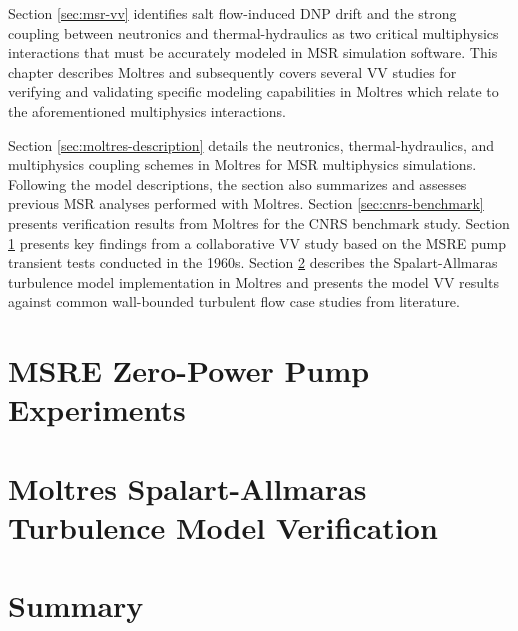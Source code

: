 Section \ref{sec:msr-vv} identifies salt flow-induced \gls{DNP} drift and the strong coupling
between neutronics and thermal-hydraulics as two critical multiphysics interactions that must be
accurately modeled in \gls{MSR} simulation software. This chapter describes Moltres and
subsequently covers several \gls{VV} studies for verifying and validating specific modeling
capabilities in Moltres which relate to the aforementioned multiphysics interactions.

Section \ref{sec:moltres-description} details the neutronics, thermal-hydraulics, and multiphysics
coupling schemes in Moltres for \gls{MSR} multiphysics simulations. Following the model
descriptions, the section also summarizes and assesses previous \gls{MSR} analyses
performed with Moltres. Section \ref{sec:cnrs-benchmark} presents verification results from Moltres
for the CNRS benchmark study. Section \ref{sec:msre-pump} presents key findings from a
collaborative \gls{VV} study based on the \gls{MSRE} pump transient tests conducted in the 1960s.
Section \ref{sec:turbulence} describes the Spalart-Allmaras turbulence model implementation in
Moltres and presents the model \gls{VV} results against common wall-bounded turbulent flow case
studies from literature.




\section{MSRE Zero-Power Pump Experiments} \label{sec:msre-pump}



\section{Moltres Spalart-Allmaras Turbulence Model Verification} \label{sec:turbulence}



\section{Summary}


